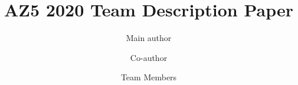 %

\documentclass[runningheads,a4paper]{llncs}
\usepackage{amssymb}
\setcounter{tocdepth}{3}
\usepackage{graphicx}
\usepackage{amssymb}
\usepackage{enumitem}
\usepackage[utf8]{inputenc}
\usepackage[hidelinks]{hyperref}
\usepackage{url}
\usepackage{float}
\usepackage{amsmath}
\usepackage{graphicx}
\usepackage{wrapfig}
\usepackage{fancyhdr}
\usepackage{titling}
\usepackage{xcolor}
\usepackage{lipsum}



%
\title{AZ5 2020 Team Description Paper}

\author{Main author \and Co-author \and Team Members}



\maketitle

